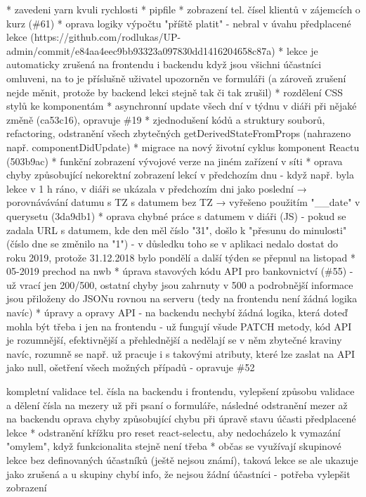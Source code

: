 * zavedeni yarn kvuli rychlosti
* pipfile
* zobrazení tel. čísel klientů v zájemcích o kurz (\#61)
* oprava logiky výpočtu "příště platit" - nebral v úvahu předplacené lekce (https://github.com/rodlukas/UP-admin/commit/e84aa4eec9bb93323a097830dd1416204658c87a)
* lekce je automaticky zrušená na frontendu i backendu když jsou všichni účastníci omluveni, na to je příslušně uživatel upozorněn ve formuláři (a zároveň zrušení nejde měnit, protože by backend lekci stejně tak či tak zrušil)
* rozdělení CSS stylů ke komponentám
* asynchronní update všech dní v týdnu v diáři při nějaké změně (ca53c16), opravuje \#19
* zjednodušení kódů a struktury souborů, refactoring, odstranění všech zbytečných getDerivedStateFromProps (nahrazeno např. componentDidUpdate)
* migrace na nový životní cyklus komponent Reactu (503b9ac)
* funkční zobrazení vývojové verze na jiném zařízení v síti
* oprava chyby způsobující nekorektní zobrazení lekcí v předchozím dnu - když např. byla lekce v 1 h ráno, v diáři se ukázala v předchozím dni jako poslední → porovnávávání datumu s TZ s datumem bez TZ → vyřešeno použitím "\_\_date" v querysetu (3da9db1)
* oprava chybné práce s datumem v diáři (JS) - pokud se zadala URL s datumem, kde den měl číslo "31", došlo k "přesunu do minulosti" (číslo dne se změnilo na "1") - v důsledku toho se v aplikaci nedalo dostat do roku 2019, protože 31.12.2018 bylo pondělí a další týden se přepnul na listopad
* 05-2019 prechod na nwb
* úprava stavových kódu API pro bankovnictví (\#55) - už vrací jen 200/500, ostatní chyby jsou zahrnuty v 500 a podrobnější informace jsou přiloženy do JSONu rovnou na serveru (tedy na frontendu není žádná logika navíc)
* úpravy a opravy API - na backendu nechybí žádná logika, která doteď mohla být třeba i jen na frontendu - už fungují všude PATCH metody, kód API je rozumnější, efektivnější a přehlednější a nedělají se v něm zbytečné kraviny navíc, rozumně se např. už pracuje i s takovými atributy, které lze zaslat na API jako null, ošetření všech možných případů - opravuje \#52

    kompletní validace tel. čísla na backendu i frontendu, vylepšení způsobu validace a dělení čísla na mezery už při psaní o formuláře, následné odstranění mezer až na backendu
    oprava chyby způsobující chybu při úpravě stavu účasti předplacené lekce
* odstranění křížku pro reset react-selectu, aby nedocházelo k vymazání "omylem", když funkcionalita stejně není třeba
* občas se využívají skupinové lekce bez definovaných účastníků (ještě nejsou známí), taková lekce se ale ukazuje jako zrušená a u skupiny chybí info, že nejsou žádní účastníci - potřeba vylepšit zobrazení


